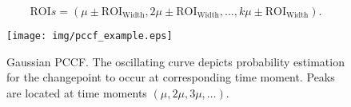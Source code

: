 \begin{equation}\label{eq:rois}
  \text{ROI}s = (\mu \pm \text{ROI}_{\text{Width}}, 2 \mu \pm \text{ROI}_{\text{Width}}, \dots , k \mu \pm \text{ROI}_{\text{Width}}).
\end{equation}
\begin{figure}[htb!]
	\centering
	\texttt{[image: img/pccf\_example.eps]}
	\caption{
    Gaussian PCCF.
		The oscillating curve depicts probability estimation for the changepoint to occur at corresponding time moment.
		Peaks are located at time moments $(\mu, 2 \mu, 3\mu, \dots)$.
	}
	\label{fig:pccf_example}
\end{figure}



